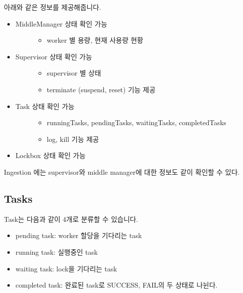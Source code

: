 \documentclass[letterpaper,10pt,english]{sphinxmanual}
\begin{document}
아래와 같은 정보를 제공해줍니다.
\begin{itemize}
\item {} \begin{description}
\item[{MiddleManager 상태 확인 가능}] \leavevmode\begin{itemize}
\item {} 
worker 별 용량, 현재 사용량 현황

\end{itemize}

\end{description}

\item {} \begin{description}
\item[{Supervisor 상태 확인 가능}] \leavevmode\begin{itemize}
\item {} 
supervisor 별 상태

\item {} 
terminate (suspend, reset) 기능 제공

\end{itemize}

\end{description}

\item {} \begin{description}
\item[{Task 상태 확인 가능}] \leavevmode\begin{itemize}
\item {} 
runningTasks, pendingTasks, waitingTasks, completedTasks

\item {} 
log, kill 기능 제공

\end{itemize}

\end{description}

\item {} 
Lockbox 상태 확인 가능

\end{itemize}

Ingestion 에는 supervisor와 middle manager에 대한 정보도 같이 확인할 수 있다.


\subsection{Tasks}
\label{\detokenize{discovery/part10/ingestion:tasks}}
Task는 다음과 같이 4개로 분류할 수 있습니다.
\begin{itemize}
\item {} 
pending task:  worker 할당을 기다리는 task

\item {} 
running task: 실행중인 task

\item {} 
waiting task: lock을 기다리는 task

\item {} 
completed task: 완료된 task로 SUCCESS, FAIL의 두 상태로 나뉜다.

\end{itemize}
\end{document}
